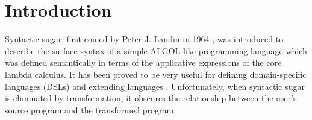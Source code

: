 \section{Introduction}









Syntactic sugar, first coined by Peter J. Landin in 1964 \cite{syntacticsugar}, was introduced to describe the surface syntax of a simple ALGOL-like programming language which was defined semantically in terms of the applicative expressions of the core lambda calculus. It has been proved to be very useful for defining domain-specific languages (DSLs) and extending languages \cite{FellFFKBMT18,CulpFFK19}.
Unfortunately, when syntactic sugar is eliminated by transformation, it obscures the relationship between the user’s source program and the transformed program.



